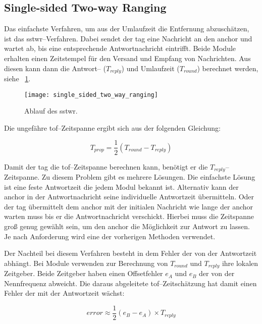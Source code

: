 \subsection{Single-sided Two-way Ranging}

Das einfachste Verfahren, um aus der Umlaufzeit die Entfernung abzuschätzen, ist das \Gls{sstwr}--Verfahren. Dabei sendet der \Gls{tag} eine Nachricht an den \Gls{anchor} und wartet ab, bis eine entsprechende Antwortnachricht eintrifft. Beide Module erhalten einen Zeitstempel für den Versand und Empfang von Nachrichten. Aus diesen kann dann die Antwort-- ($T_{reply}$) und Umlaufzeit ($T_{round}$) berechnet werden, siehe \figurename~\ref{fig:single_sided_two_way_ranging}. \cite{decawave2015twr, decawave2016dw1kusermanual}

\begin{figure}[ht]
	\centering
	\texttt{[image: single\_sided\_two\_way\_ranging]}
	\caption{Ablauf des \acrlong{sstwr}.}
	\label{fig:single_sided_two_way_ranging}
\end{figure}

Die ungefähre \Gls{tof}--Zeitspanne ergibt sich aus der folgenden Gleichung:

\[T_{prop}=\frac{1}{2}\left(T_{round}-T_{reply}\right)\]

Damit der \Gls{tag} die \Gls{tof}--Zeitspanne berechnen kann, benötigt er die $T_{reply}$--Zeitspanne. Zu diesem Problem gibt es mehrere Lösungen. Die einfachste Lösung ist eine feste Antwortzeit die jedem Modul bekannt ist. Alternativ kann der \Gls{anchor} in der Antwortnachricht seine individuelle Antwortzeit übermitteln. Oder der \Gls{tag} übermittelt dem \Gls{anchor} mit der initialen Nachricht wie lange der \Gls{anchor} warten muss bis er die Antwortnachricht verschickt. Hierbei muss die Zeitspanne groß genug gewählt sein, um den \Gls{anchor} die Möglichkeit zur Antwort zu lassen. Je nach Anforderung wird eine der vorherigen Methoden verwendet.

Der Nachteil bei diesem Verfahren besteht in dem Fehler der von der Antwortzeit abhängt. Bei Module verwenden zur Berechnung von $T_{round}$ und $T_{reply}$ ihre lokalen Zeitgeber. Beide Zeitgeber haben einen Offsetfehler $e_{A}$ und $e_{B}$ der von der Nennfrequenz abweicht. Die daraus abgeleitete \Gls{tof}--Zeitschätzung hat damit einen Fehler der mit der Antwortzeit wächst:

\[error\approx\frac{1}{2}\left(e_B-e_A\right)\times T_{reply}\]


